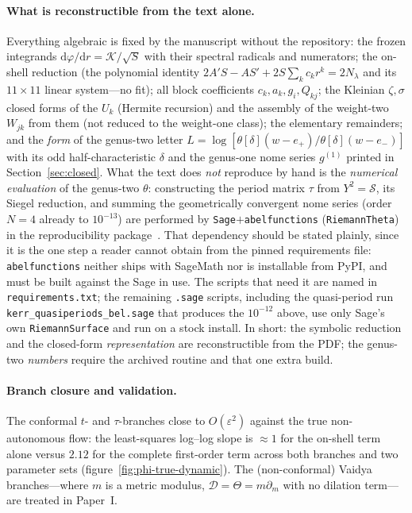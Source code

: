 \documentclass[12pt]{iopart}
\theoremstyle{plain}
\theoremstyle{definition}
\theoremstyle{remark}
\newcommand{\dd}{\mathrm{d}}
\begin{document}
\paragraph{What is reconstructible from the text alone.} Everything algebraic is fixed
by the manuscript without the repository: the frozen integrands
$\dd\varphi/\dd r=\mathcal K/\sqrt S$ with their spectral radicals and numerators;
the on-shell reduction (the polynomial identity $2A'S-AS'+2S\sum_k c_kr^k=2N_\lambda$
and its $11\times11$ linear system---no fit); all block coefficients $c_k,a_k,g_i,Q_{kj}$;
the Kleinian $\zeta,\sigma$ closed forms of the $U_k$ (Hermite recursion) and the assembly
of the weight-two $W_{jk}$ from them (not reduced to the weight-one class); the elementary
remainders; and the \emph{form} of the genus-two letter
$L=\log[\theta[\delta](w-e_+)/\theta[\delta](w-e_-)]$ with its odd half-characteristic
$\delta$ and the genus-one nome series $g^{(1)}$ printed in
Section~\ref{sec:closed}. What the text does \emph{not} reproduce by hand is the
\emph{numerical evaluation} of the genus-two $\theta$: constructing the period matrix
$\tau$ from $Y^2=\mathcal S$, its Siegel reduction, and summing the geometrically
convergent nome series (order $N{=}4$ already to $10^{-13}$) are performed by
\texttt{Sage}$+$\texttt{abelfunctions} (\texttt{RiemannTheta}) in the reproducibility
package~\cite{Rosignoli2026Code}. That dependency should be stated plainly, since it
is the one step a reader cannot obtain from the pinned requirements file:
\texttt{abelfunctions} neither ships with SageMath nor is installable from PyPI, and
must be built against the Sage in use. The scripts that need it are named in
\texttt{requirements.txt}; the remaining \texttt{.sage} scripts, including the
quasi-period run \texttt{kerr\_quasiperiods\_bel.sage} that produces the $10^{-12}$
above, use only Sage's own \texttt{RiemannSurface} and run on a stock install. In
short: the symbolic reduction and the closed-form \emph{representation} are
reconstructible from the PDF; the genus-two \emph{numbers} require the archived
routine and that one extra build.

\paragraph{Branch closure and validation.} The conformal $t$- and $\tau$-branches close
to $O(\varepsilon^2)$ against the true non-autonomous flow: the least-squares log--log
slope is $\approx1$ for the on-shell term alone versus $2.12$ for the complete first-order
term across both branches and two parameter sets (figure~\ref{fig:phi-true-dynamic}). The
(non-conformal) Vaidya branches---where $m$ is a metric modulus, $\mathcal D=\Theta=
m\partial_m$ with no dilation term---are treated in Paper~I.
\end{document}
